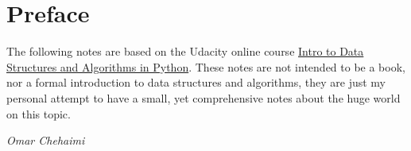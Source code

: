 
\chapter*{Preface}

The following notes are based on the Udacity online course \href{https://www.udacity.com/course/data-structures-and-algorithms-in-python--ud513}{Intro to Data Structures and Algorithms in Python}. These notes are not intended to be a book, nor a formal introduction to data structures and algorithms, they are just my personal attempt to have a small, yet comprehensive notes about the huge world on this topic.
 
\begin{flushright}
	\textit{Omar Chehaimi}
\end{flushright}

\hfill

\vfill

\noindent
\textsf{}

\noindent
{}\,